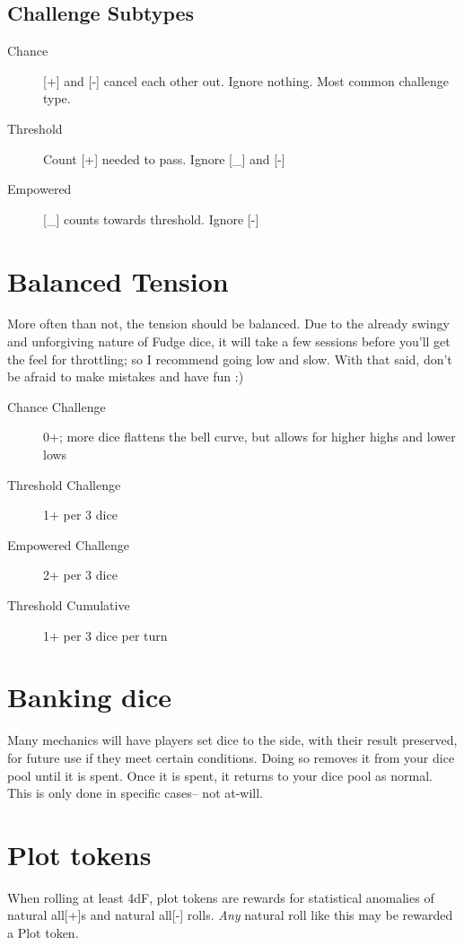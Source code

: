 \documentclass[statementpaper,oneside,article,12pt]{memoir}
\begin{document}
	\subsection*{Challenge Subtypes}
	\begin{description}
	\item[Chance] [+] and [-] cancel each other out.  Ignore nothing. Most common challenge type.
	\item[Threshold] Count [+] needed to pass. Ignore [\_] and [-]
	\item[Empowered] [\_] counts towards threshold. Ignore [-]
	\end{description}	
		
	\section*{Balanced Tension}
	More often than not, the tension should be balanced. Due to the already swingy and unforgiving nature of Fudge dice, it will take a few sessions before you'll get the feel for throttling; so I recommend going low and slow. With that said, don't be afraid to make mistakes and have fun :)
	\begin{description}
		\item[Chance Challenge] 0+; more dice flattens the bell curve, but allows for higher highs and lower lows
		\item[Threshold Challenge] 1+ per 3 dice 
		\item[Empowered Challenge] 2+ per 3 dice
		\item[Threshold Cumulative] 1+ per 3 dice per turn
	\end{description}
		
	\section*{Banking dice}
	Many mechanics will have players set dice to the side, with their result preserved, for future use if they meet certain conditions.
	Doing so removes it from your dice pool until it is spent. Once it is spent, it returns to your dice pool as normal. This is only done in specific cases-- not at-will.
	
	\section*{Plot tokens}
	When rolling at least 4dF, plot tokens are rewards for statistical anomalies of natural all[+]s and natural all[-] rolls. \textit{Any} natural roll like this may be rewarded a Plot token.
	
\end{document}

